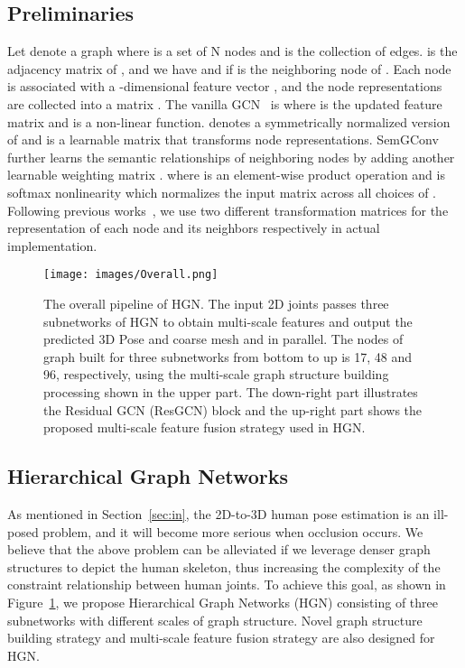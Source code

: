 \documentclass{bmvc2k}
\begin{document}
\subsection{Preliminaries}
\label{sec:gcn}
Let  denote a graph where  is a set of N  nodes and    is the collection of edges.  is the adjacency matrix of , and we have  and  if  is the neighboring node of . Each node  is associated with a -dimensional feature vector , and the node representations are collected into a matrix . The vanilla GCN~\cite{kipf2016semi} is
where  is the updated feature matrix and  is a non-linear function.  denotes a symmetrically normalized version of  and  is a learnable matrix that transforms node representations.  SemGConv~\cite{zhao2019semantic} further learns the semantic relationships of neighboring nodes by adding another learnable weighting matrix .
where  is an element-wise product operation and  is softmax nonlinearity which normalizes the input matrix across all choices of . Following previous works~\cite{liu2020comprehensive,zhao2019semantic,yan2018spatial}, we use two different transformation matrices for the representation of each node  and its neighbors respectively in actual implementation.
\begin{figure}[!t]
\renewcommand{\baselinestretch}{1.0}
\setlength{\abovecaptionskip}{-15pt}
\setlength{\belowcaptionskip}{-10pt}
\begin{center}
\texttt{[image: images/Overall.png]}
\end{center}
\caption{The overall pipeline of HGN. The input 2D joints  passes three subnetworks of HGN to obtain multi-scale features and output the predicted 3D Pose  and coarse mesh  and  in parallel. The nodes of graph built for three subnetworks from bottom to up is 17, 48 and 96, respectively, using the multi-scale graph structure building processing shown in the upper part. The down-right part illustrates the Residual GCN (ResGCN) block and the up-right part shows the proposed multi-scale feature fusion strategy used in HGN. }\label{fig:pipeline}
\end{figure}

\subsection{Hierarchical Graph Networks}


As mentioned in Section~\ref{sec:in}, the 2D-to-3D human pose estimation is an ill-posed problem, and it will become more serious when occlusion occurs. We believe that the above problem can be alleviated if we leverage denser graph structures to depict the human skeleton, thus increasing the complexity of the constraint relationship between human joints. To achieve this goal, as shown in Figure~\ref{fig:pipeline}, we propose Hierarchical Graph Networks (HGN) consisting of three subnetworks with different scales of graph structure. Novel graph structure building strategy and multi-scale feature fusion strategy are also designed for HGN. 
\end{document}
